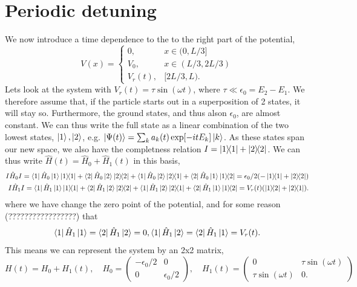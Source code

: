 \documentclass{article}
\begin{document}
\section*{Periodic detuning}
    We now introduce a time dependence to the to the right part of the potential, 
    \begin{equation*}
        V(x) = 
        \begin{cases}
            0, & x \in (0, L/3] \\
            V_0, & x \in (L/3, 2L/3) \\
            V_r(t), & [2L/3, L).
        \end{cases}
    \end{equation*}
    Lets look at the system with $V_r(t) = \tau \sin(\omega t)$, where $\tau \ll \epsilon_0 = E_2 - E_1$. We therefore assume that, if the particle starts out in a superposition of 2 states, it will stay so. Furthermore, the ground states, and thus alson $\epsilon_0$, are almost constant. We can thus write the full state as a linear combination of the two lowest states, $\ket{1}, \ket{2}$, e.g. $\ket{\Psi(t)} = \sum_k a_k(t) \exp[-itE_k] \ket{k}$. As these states span our new space, we also have the completness relation $I = \ketbra{1}{1} + \ketbra{2}{2}$. We can thus write $\hat H(t) = \hat H_0 + \hat H_1(t)$ in this basis,
    \begin{align*}
            I \hat H_0 I 
            = \bra{1} \hat H_0 \ket{1} \ketbra{1}{1} + \bra{2} \hat H_0 \ket{2} \ketbra{2}{2} + \bra{1} \hat H_0 \ket{2} \ketbra{2}{1} + \bra{2} \hat H_0 \ket{1} \ketbra{1}{2} 
            = \epsilon_0/2 (-\ketbra{1}{1} +\ketbra{2}{2}) \\
            I \hat H_1 I
            = \bra{1} \hat H_1 \ket{1} \ketbra{1}{1} + \bra{2} \hat H_1 \ket{2} \ketbra{2}{2} + \bra{1} \hat H_1 \ket{2} \ketbra{2}{1} + \bra{2} \hat H_1 \ket{1} \ketbra{1}{2} = V_r(t)(\ketbra{1}{2} + \ketbra{2}{1}).
    \end{align*}
    where we have change the zero point of the potential, and for some reason (?????????????????) that
    \begin{equation*}
        \bra{1} \hat H_1 \ket{1} =  \bra{2} \hat H_1 \ket{2} = 0, \bra{1} \hat H_1 \ket{2} = \bra{2} \hat H_1 \ket{1} = V_r(t).
    \end{equation*}
    This means we can represent the system by an 2x2 matrix, 
    \begin{equation*}
        H(t) = H_0 + H_1(t), \quad
        H_0 = 
        \begin{pmatrix}
            -\epsilon_0 / 2 & 0 \\
            0 & \epsilon_0 / 2
        \end{pmatrix}
        , \quad
        H_1(t) = 
        \begin{pmatrix}
            0 & \tau \sin(\omega t) \\
            \tau \sin(\omega t) & 0.
        \end{pmatrix}
    \end{equation*}
\end{document}
